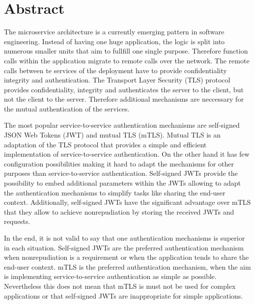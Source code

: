 \chapter{Abstract}
The microservice architecture is a currently emerging pattern in software engineering.
Instead of having one huge application, the logic is split into numerous smaller units that aim to fullfill one single purpose.
Therefore function calls within the application migrate to remote calls over the network.
The remote calls between te services of the deployment have to provide confidentiality integrity and authentication.
The Transport Layer Security (TLS) protocol provides confidentiality, integrity and authenticates the server to the client, but not the client to the server.
Therefore additional mechanisms are neccessary for the mutual authentication of the services.

The most popular service-to-service authentication mechanisms are self-signed JSON Web Tokens (JWT) and mutual TLS (mTLS).
Mutual TLS is an adaptation of the TLS protocol that provides a simple and efficient implementation of service-to-service authentication.
On the other hand it has few configuration possibilities making it hard to adapt the mechanisms for other purposes than service-to-service authentication.
Self-signed JWTs provide the possibility to embed additional parameters within the JWTs allowing to adapt the authentication mechanisms to simplify tasks like sharing the end-user context.
Additionally, self-signed JWTs have the significant advantage over mTLS that they allow to achieve nonrepudiation by storing the received JWTs and requests.

In the end, it is not valid to say that one authentication mechanisms is superior in each situation.
Self-signed JWTs are the preferred authentication mechanism when nonrepudiation is a requirement or when the application tends to share the end-user context.
mTLS is the preferred authentication mechanism, when the aim is implementing service-to-service authentication as simple as possible.
Nevertheless this does not mean that mTLS is must not be used for complex applications or that self-signed JWTs are inappropriate for simple applications.
